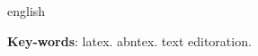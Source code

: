 \begin{resumo}[Abstract]
 \begin{otherlanguage*}{english}
 

   \vspace{\onelineskip}
 
   \noindent 
   \textbf{Key-words}: latex. abntex. text editoration.
 \end{otherlanguage*}
\end{resumo}
